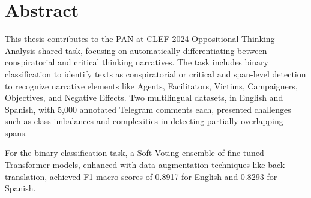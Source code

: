 \documentclass{Configuration_Files/PoliMi3i_thesis}
\begin{document}


\pagestyle{empty} %
\frontmatter %


\startpreamble
\setcounter{page}{1} %

\chapter*{Abstract}
This thesis contributes to the PAN at CLEF 2024 Oppositional Thinking Analysis shared task, focusing on automatically differentiating between conspiratorial and critical thinking narratives. The task includes binary classification to identify texts as conspiratorial or critical and span-level detection to recognize narrative elements like Agents, Facilitators, Victims, Campaigners, Objectives, and Negative Effects. Two multilingual datasets, in English and Spanish, with 5,000 annotated Telegram comments each, presented challenges such as class imbalances and complexities in detecting partially overlapping spans. 

For the binary classification task, a Soft Voting ensemble of fine-tuned Transformer models, enhanced with data augmentation techniques like back-translation, achieved F1-macro scores of 0.8917 for English and 0.8293 for Spanish.
\end{document}
